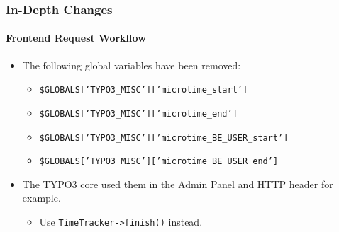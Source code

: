 \begin{frame}[fragile]
	\frametitle{In-Depth Changes}
	\framesubtitle{Frontend Request Workflow}

	\lstset{basicstyle=\smaller\ttfamily}

	\begin{itemize}
		\item The following global variables have been removed:

			\begin{itemize}
				\item \texttt{\$GLOBALS['TYPO3\_MISC']['microtime\_start']}
				\item \texttt{\$GLOBALS['TYPO3\_MISC']['microtime\_end']}
				\item \texttt{\$GLOBALS['TYPO3\_MISC']['microtime\_BE\_USER\_start']}
				\item \texttt{\$GLOBALS['TYPO3\_MISC']['microtime\_BE\_USER\_end']}
			\end{itemize}

		\item The TYPO3 core used them in the Admin Panel and HTTP header for example.

			\begin{itemize}\smaller
				\item[\ding{228}] Use \texttt{TimeTracker->finish()} instead.
			\end{itemize}\normalsize

	\end{itemize}

\end{frame}



